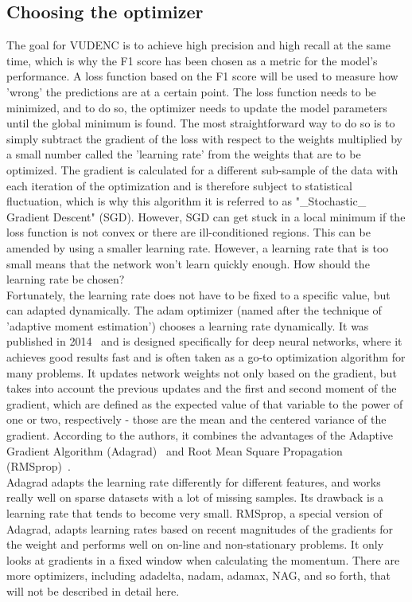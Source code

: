 \documentclass[
a4paper,
pagesize,
pdftex,
12pt,
twoside, %
BCOR=5mm, %
ngerman,
fleqn,
final,
]{scrartcl}
\begin{document}
	\subsection{Choosing the optimizer}\label{optimizer}
	The goal for VUDENC is to achieve high precision and high recall at the same time, which is why the F1 score has been chosen as a metric for the model's performance. A loss function based on the F1 score will be used to measure how 'wrong' the predictions are at a certain point. The loss function needs to be minimized, and to do so, the optimizer needs to update the model parameters until the global minimum is found. 	The most straightforward way to do so is to simply subtract the gradient of the loss with respect to the weights multiplied by a small number called the 'learning rate' from the weights that are to be optimized. The gradient is calculated for a different sub-sample of the data with each iteration of the optimization and is therefore subject to statistical fluctuation, which is why this algorithm it is referred to as "\_Stochastic\_ Gradient Descent" (SGD). However, SGD can get stuck in a local minimum if the loss function is not convex or there are ill-conditioned regions. This can be amended by using a smaller learning rate. However, a learning rate that is too small means that the network won't learn quickly enough. How should the learning rate be chosen?\\
	Fortunately, the learning rate does not have to be fixed to a specific value, but can adapted dynamically. The adam optimizer (named after the technique of 'adaptive moment estimation') chooses a learning rate dynamically. It was published in 2014~\cite{Kingma.2014} and is designed specifically for deep neural networks, where it achieves good results fast and is often taken as a go-to optimization algorithm for many problems. It updates network weights not only based on the gradient, but takes into account the previous updates and the first and second moment of the gradient, which are defined as the expected value of that variable to the power of one or two, respectively - those are the mean and the centered variance of the gradient. According to the authors, it combines the advantages of the Adaptive Gradient Algorithm (Adagrad)~\cite{Duchi.2011} and Root Mean Square Propagation (RMSprop)~\cite{Tieleman.2012}.\\
	Adagrad adapts the learning rate differently for different features, and works really well on sparse datasets with a lot of missing samples. Its drawback is a learning rate that tends to become very small. RMSprop, a special version of Adagrad, adapts learning rates based on recent magnitudes of the gradients for the weight and performs well on on-line and non-stationary problems. It only looks at gradients in a fixed window when calculating the momentum. There are more optimizers, including adadelta, nadam, adamax, NAG, and so forth, that will not be described in detail here.\\
\end{document}
